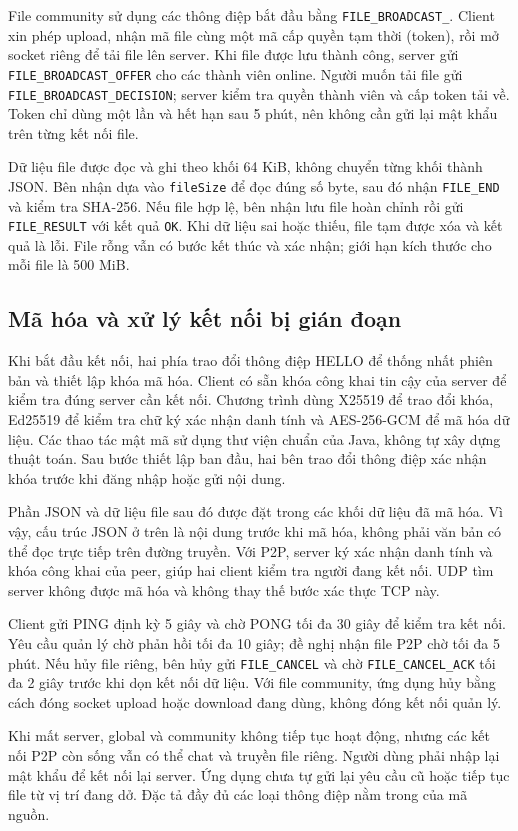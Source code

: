 File community sử dụng các thông điệp bắt đầu bằng \texttt{FILE\_BROADCAST\_}.
Client xin phép upload, nhận mã file cùng một mã cấp quyền tạm thời (token),
rồi mở socket riêng để tải file lên server. Khi file được lưu thành công, server
gửi \texttt{FILE\_BROADCAST\_OFFER} cho các thành viên online. Người muốn tải file gửi
\texttt{FILE\_BROADCAST\_DECISION}; server kiểm tra quyền thành viên và cấp token tải về.
Token chỉ dùng một lần và hết hạn sau 5 phút, nên không cần gửi lại mật khẩu
trên từng kết nối file.

Dữ liệu file được đọc và ghi theo khối 64 KiB, không chuyển từng khối thành JSON.
Bên nhận dựa vào \texttt{fileSize} để đọc đúng số byte, sau đó nhận
\texttt{FILE\_END} và kiểm tra SHA-256. Nếu file hợp lệ, bên nhận lưu file hoàn
chỉnh rồi gửi \texttt{FILE\_RESULT} với kết quả \texttt{OK}. Khi dữ liệu sai hoặc
thiếu, file tạm được xóa và kết quả là lỗi. File rỗng vẫn có bước kết thúc và
xác nhận; giới hạn kích thước cho mỗi file là 500 MiB.

\subsection{Mã hóa và xử lý kết nối bị gián đoạn}

Khi bắt đầu kết nối, hai phía trao đổi thông điệp HELLO để thống nhất phiên bản
và thiết lập khóa mã hóa. Client có sẵn khóa công khai tin cậy của server để
kiểm tra đúng server cần kết nối. Chương trình dùng X25519 để trao đổi khóa,
Ed25519 để kiểm tra chữ ký xác nhận danh tính và AES-256-GCM để mã hóa dữ liệu.
Các thao tác mật mã sử dụng thư viện chuẩn của Java, không tự xây dựng thuật toán.
Sau bước thiết lập ban đầu, hai bên trao đổi thông điệp xác nhận khóa trước khi
đăng nhập hoặc gửi nội dung.

Phần JSON và dữ liệu file sau đó được đặt trong các khối dữ liệu đã mã hóa.
Vì vậy, cấu trúc JSON ở trên là nội dung trước khi mã hóa, không phải văn bản
có thể đọc trực tiếp trên đường truyền. Với P2P, server ký xác nhận danh tính
và khóa công khai của peer, giúp hai client kiểm tra người đang kết nối.
UDP tìm server không được mã hóa và không thay thế bước xác thực TCP này.

Client gửi PING định kỳ 5 giây và chờ PONG tối đa 30 giây để kiểm tra kết nối.
Yêu cầu quản lý chờ phản hồi tối đa 10 giây; đề nghị nhận file P2P chờ tối đa
5 phút. Nếu hủy file riêng, bên hủy gửi \texttt{FILE\_CANCEL} và chờ
\texttt{FILE\_CANCEL\_ACK} tối đa 2 giây trước khi dọn kết nối dữ liệu.
Với file community, ứng dụng hủy bằng cách đóng socket upload hoặc download
đang dùng, không đóng kết nối quản lý.

Khi mất server, global và community không tiếp tục hoạt động, nhưng các kết nối
P2P còn sống vẫn có thể chat và truyền file riêng. Người dùng phải nhập lại mật
khẩu để kết nối lại server. Ứng dụng chưa tự gửi lại yêu cầu cũ hoặc tiếp tục
file từ vị trí đang dở. Đặc tả đầy đủ các loại thông điệp nằm trong
 của mã nguồn.

\endgroup
